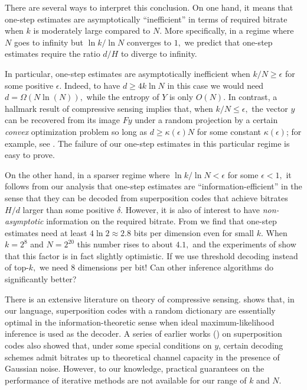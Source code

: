 There are several ways to interpret this conclusion. On one hand, it means that one-step estimates are asymptotically ``inefficient'' in terms of required bitrate when $k$ is moderately large compared to $N.$ More specifically, in a regime where $N$ goes to infinity but $\ln k / \ln N$ converges to $1,$ we predict that one-step estimates require the ratio $d/H$ to diverge to infinity.

In particular, one-step estimates are asymptotically inefficient when $k/N \ge \epsilon$ for some positive $\epsilon.$ Indeed, to have $d \ge 4 k \ln N$ in this case we would need $d = \Omega(N \ln(N)),$ while the entropy of $Y$ is only $O(N).$ In contrast, a hallmark result of compressive sensing implies that, when $k/N \le \epsilon,$ the vector $y$ can be recovered from its image $F y$ under a random projection by a certain \textit{convex} optimization problem so long as $d \ge \kappa(\epsilon) N$ for some constant $\kappa(\epsilon)$; for example, see \cite{candes_decoding_2005}. The failure of our one-step estimates in this particular regime is easy to prove.

On the other hand, in a sparser regime where $\ln k / \ln N < \epsilon$ for some $\epsilon < 1,$ it follows from our analysis that one-step estimates are ``information-efficient'' in the sense that they can be decoded from superposition codes that achieve bitrates $H/d$ larger than some positive $\delta.$ However, it is also of interest to have \textit{non-asymptotic} information on the required bitrate. From  we find that one-step estimates need at least $4 \ln 2 \approx 2.8$ bits per dimension even for small $k.$ When $k = 2^8$ and $N = 2^{20}$ this number rises to about $4.1,$ and the experiments of  show that this factor is in fact slightly optimistic. If we use threshold decoding instead of top-$k,$ we need $8$ dimensions per bit! Can other inference algorithms do significantly better?

There is an extensive literature on theory of compressive sensing. \cite{reeves_all-or-nothing_2019} shows that, in our language, superposition codes with a random dictionary are essentially optimal in the information-theoretic sense when ideal maximum-likelihood inference is used as the decoder. A series of earlier works (\cite{joseph_least_2012, joseph_fast_2014, rush_capacity-achieving_2017}) on superposition codes also showed that, under some special conditions on $y$, certain decoding schemes admit bitrates up to theoretical channel capacity in the presence of Gaussian noise. However, to our knowledge, practical guarantees on the performance of iterative methods are not available for our range of $k$ and $N.$

